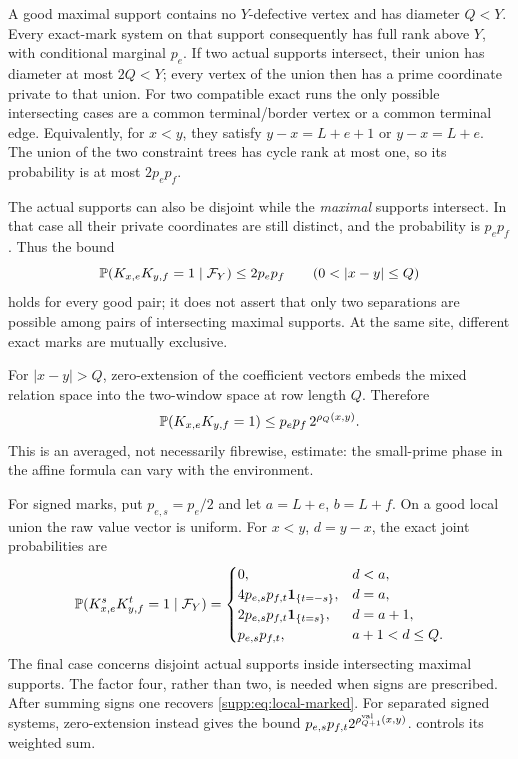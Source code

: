 A good maximal support contains no $Y$-defective vertex and has diameter
$Q<Y$. Every exact-mark system on that support consequently has full rank
above $Y$, with conditional marginal $p_e$. If two actual supports intersect,
their union has diameter at most $2Q<Y$; every vertex of the union then has a
prime coordinate private to that union. For two compatible exact runs the
only possible intersecting cases are a common terminal/border vertex or a
common terminal edge. Equivalently, for $x<y$, they satisfy
$y-x=L+e+1$ or $y-x=L+e$. The union of the two constraint trees has cycle
rank at most one, so its probability is at most $2p_ep_f$.

The actual supports can also be disjoint while the \emph{maximal} supports
intersect. In that case all their private coordinates are still distinct,
and the probability is $p_ep_f$. Thus the bound
\begin{equation}\label{supp:eq:local-marked}
 \PP(K_{x,e}K_{y,f}=1\mid\mathcal F_Y)\le 2p_ep_f
 \qquad(0<|x-y|\le Q)
\end{equation}
holds for every good pair; it does not assert that only two separations are
possible among pairs of intersecting maximal supports. At the same site,
different exact marks are mutually exclusive.

For $|x-y|>Q$, zero-extension of the coefficient vectors embeds the mixed
relation space into the two-window space at row length $Q$. Therefore
\begin{equation}\label{supp:eq:mixed-domination}
 \mathbb P(K_{x,e}K_{y,f}=1)\le p_ep_f\,2^{\rho_Q(x,y)}.
\end{equation}
This is an averaged, not necessarily fibrewise, estimate: the small-prime
phase in the affine formula can vary with the environment.


For signed marks, put $p_{e,s}=p_e/2$ and let $a=L+e$, $b=L+f$.
On a good local union the raw value vector is uniform. For $x<y$,
$d=y-x$, the exact joint probabilities are
\[
 \mathbb P(K^s_{x,e}K^t_{y,f}=1\mid\mathcal F_Y)=
 \begin{cases}
  0,&d<a,\\
  4p_{e,s}p_{f,t}\mathbf 1_{\{t=-s\}},&d=a,\\
  2p_{e,s}p_{f,t}\mathbf 1_{\{t=s\}},&d=a+1,\\
  p_{e,s}p_{f,t},&a+1<d\le Q.
 \end{cases}
\]
The final case concerns disjoint actual supports inside intersecting
maximal supports. The factor four, rather than two, is needed when signs
are prescribed. After summing signs one recovers
\eqref{supp:eq:local-marked}. For separated signed systems, zero-extension
instead gives the bound
$p_{e,s}p_{f,t}2^{\rho^{\rm val}_{Q+1}(x,y)}$.
 controls its weighted sum.

